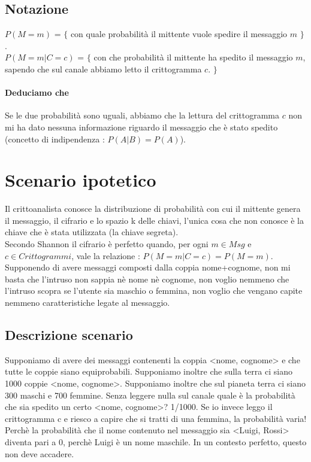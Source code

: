 \subsection{Notazione}

$P(M = m)$ = $\{$ con quale probabilità il mittente vuole spedire il messaggio $m$ $\}$ .  \\
$P(M = m | C = c)$ = $\{$ con che probabilità il mittente ha spedito il messaggio $m$, sapendo che sul canale abbiamo letto il crittogramma $c$. $\}$

\paragraph{Deduciamo che} Se le due probabilità sono uguali, abbiamo che la lettura del crittogramma $c$ non mi ha dato nessuna informazione riguardo il messaggio che è stato spedito (concetto di indipendenza : $P(A|B) = P(A)$).

\section{Scenario ipotetico}

Il crittoanalista conosce la distribuzione di probabilità con cui il mittente genera il messaggio, il cifrario e lo spazio k delle chiavi, l'unica cosa che non conosce è la chiave che è stata utilizzata (la chiave segreta). \\
Secondo Shannon il cifrario è perfetto quando, per ogni $m \in Msg$ e $c \in Crittogrammi$, vale la relazione :  $P(M = m | C = c) = P(M = m)$.
Supponendo di avere messaggi composti dalla coppia nome+cognome, non mi basta che l'intruso non sappia nè nome nè cognome, non voglio nemmeno che l'intruso scopra se l'utente sia maschio o femmina, non voglio che vengano capite nemmeno caratteristiche legate al messaggio.
\subsection{Descrizione scenario}
Supponiamo di avere dei messaggi contenenti la coppia <nome, cognome> e che tutte le coppie siano equiprobabili. Supponiamo inoltre che sulla terra ci siano 1000 coppie <nome, cognome>. Supponiamo inoltre che sul pianeta terra ci siano 300 maschi e 700 femmine. Senza leggere nulla sul canale quale è la probabilità che sia spedito un certo <nome, cognome>? 1/1000. Se io invece leggo il crittogramma c e riesco a capire che si tratti di una femmina, la probabilità varia! Perchè la probabilità che il nome contenuto nel messaggio sia <Luigi, Rossi> diventa pari a 0, perchè Luigi è un nome maschile. In un contesto perfetto, questo non deve accadere.

